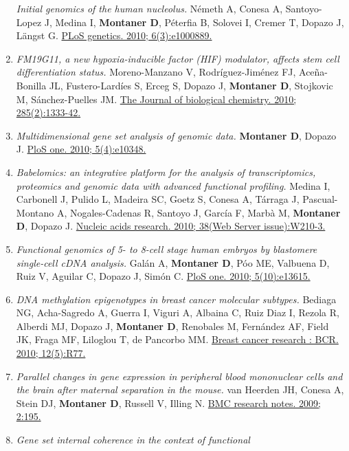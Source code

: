 \begin{enumerate}
  \emph{Initial genomics of the human nucleolus.} Németh A, Conesa A,
  Santoyo-Lopez J, Medina I, \textbf{Montaner D}, Péterfia B, Solovei I,
  Cremer T, Dopazo J, Längst G.
  \href{http://www.ncbi.nlm.nih.gov//pubmed/20361057}{PLoS genetics.
  2010; 6(3):e1000889.}
\item
  \emph{FM19G11, a new hypoxia-inducible factor (HIF) modulator, affects
  stem cell differentiation status.} Moreno-Manzano V, Rodríguez-Jiménez
  FJ, Aceña-Bonilla JL, Fustero-Lardíes S, Erceg S, Dopazo J,
  \textbf{Montaner D}, Stojkovic M, Sánchez-Puelles JM.
  \href{http://www.ncbi.nlm.nih.gov//pubmed/19897487}{The Journal of
  biological chemistry. 2010; 285(2):1333-42.}
\item
  \emph{Multidimensional gene set analysis of genomic data.}
  \textbf{Montaner D}, Dopazo J.
  \href{http://www.ncbi.nlm.nih.gov//pubmed/20436964}{PloS one. 2010;
  5(4):e10348.}
\item
  \emph{Babelomics: an integrative platform for the analysis of
  transcriptomics, proteomics and genomic data with advanced functional
  profiling.} Medina I, Carbonell J, Pulido L, Madeira SC, Goetz S,
  Conesa A, Tárraga J, Pascual-Montano A, Nogales-Cadenas R, Santoyo J,
  García F, Marbà M, \textbf{Montaner D}, Dopazo J.
  \href{http://www.ncbi.nlm.nih.gov//pubmed/20478823}{Nucleic acids
  research. 2010; 38(Web Server issue):W210-3.}
\item
  \emph{Functional genomics of 5- to 8-cell stage human embryos by
  blastomere single-cell cDNA analysis.} Galán A, \textbf{Montaner D},
  Póo ME, Valbuena D, Ruiz V, Aguilar C, Dopazo J, Simón C.
  \href{http://www.ncbi.nlm.nih.gov//pubmed/21049019}{PloS one. 2010;
  5(10):e13615.}
\item
  \emph{DNA methylation epigenotypes in breast cancer molecular
  subtypes.} Bediaga NG, Acha-Sagredo A, Guerra I, Viguri A, Albaina C,
  Ruiz Diaz I, Rezola R, Alberdi MJ, Dopazo J, \textbf{Montaner D},
  Renobales M, Fernández AF, Field JK, Fraga MF, Liloglou T, de Pancorbo
  MM. \href{http://www.ncbi.nlm.nih.gov//pubmed/20920229}{Breast cancer
  research : BCR. 2010; 12(5):R77.}
\item
  \emph{Parallel changes in gene expression in peripheral blood
  mononuclear cells and the brain after maternal separation in the
  mouse.} van Heerden JH, Conesa A, Stein DJ, \textbf{Montaner D},
  Russell V, Illing N.
  \href{http://www.ncbi.nlm.nih.gov//pubmed/19781058}{BMC research
  notes. 2009; 2:195.}
\item
  \emph{Gene set internal coherence in the context of functional
}
\end{enumerate}
